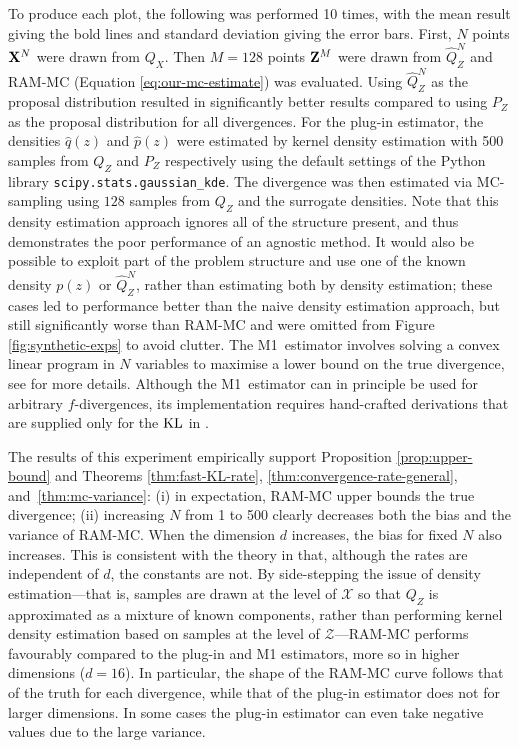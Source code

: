 To produce each plot, the following was performed 10 times, with the mean result giving the bold lines and standard deviation giving the error bars.
First, $N$ points $\mathbf{X}^N$ were drawn from $Q_X$. 
Then $M{=}128$ points $\mathbf{Z}^M$ were drawn from $\hat{Q}_Z^N$ and RAM-MC (Equation \ref{eq:our-mc-estimate}) was evaluated. 
Using $\hat{Q}_Z^N$ as the proposal distribution resulted in significantly better results compared to using $P_Z$ as the proposal distribution for all divergences.
For the plug-in estimator, the densities $\hat{q}(z)$ and $\hat{p}(z)$ were estimated by kernel density estimation with 500 samples from $Q_Z$ and $P_Z$ respectively using the default settings of the Python library {\texttt{scipy.stats.gaussian\_kde}}.
The divergence was then estimated via MC-sampling using $128$ samples from $Q_Z$ and the surrogate densities.
Note that this density estimation approach ignores all of the structure present, and thus demonstrates the poor performance of an agnostic method. 
It would also be possible to exploit part of the problem structure and use one of the known density $p(z)$ or $\widehat{Q}_Z^N$, rather than estimating both by density estimation; these cases led to performance better than the naive density estimation approach, but still significantly worse than RAM-MC and were omitted from Figure \ref{fig:synthetic-exps} to avoid clutter. 
The M1~estimator involves solving a convex linear program in $N$ variables to maximise a lower bound on the true divergence, see \cite{nguyen10ratio} for more details.
Although the M1~estimator can in principle be used for arbitrary $f$-divergences, its implementation requires hand-crafted derivations that are supplied only for the $\mathrm{KL}$ in \cite{nguyen10ratio}.

The results of this experiment empirically support Proposition \ref{prop:upper-bound} and Theorems \ref{thm:fast-KL-rate}, \ref{thm:convergence-rate-general}, and~\ref{thm:mc-variance}:
(i) in expectation, RAM-MC upper bounds the true divergence; (ii) increasing $N$ from 1 to 500 clearly decreases both the bias and the variance of RAM-MC.
When the dimension $d$ increases, the bias for fixed $N$ also increases.
This is consistent with the theory in that, although the rates are independent of $d$, the constants are not.
By side-stepping the issue of density estimation---that is, samples are drawn at the level of $\mathcal{X}$ so that $Q_Z$ is approximated as a mixture of known components, rather than performing kernel density estimation based on samples at the level of $\mathcal{Z}$---RAM-MC performs favourably compared to the plug-in and M1 estimators, more so in higher dimensions ($d=16$).
In particular, the shape of the RAM-MC curve follows that of the truth for each divergence, while that of the plug-in estimator does not for larger dimensions.
In some cases the plug-in estimator can even take negative values due to the large variance.




